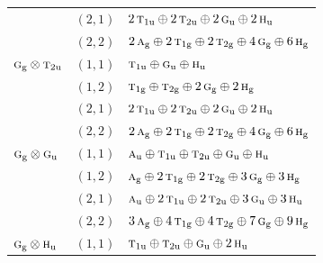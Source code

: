 \documentclass[11pt]{article}
\newcommand{\irr}[1]{\text{\normalfont\scshape #1}}
\newcommand{\ptag}[1]{\mathrm{#1}}
\begin{document}
\begin{longtable}{p{} c p{}}
 & $(2,1)$ & $2\,\irr{t}_{1\ptag{u}}\oplus 2\,\irr{t}_{2\ptag{u}}\oplus 2\,\irr{g}_{\ptag{u}}\oplus 2\,\irr{h}_{\ptag{u}}$\\

 & $(2,2)$ & $2\,\irr{a}_{\ptag{g}}\oplus 2\,\irr{t}_{1\ptag{g}}\oplus 2\,\irr{t}_{2\ptag{g}}\oplus 4\,\irr{g}_{\ptag{g}}\oplus 6\,\irr{h}_{\ptag{g}}$\\

\hline

$\irr{g}_{\ptag{g}}\otimes \irr{t}_{2\ptag{u}}$ & $(1,1)$ & $\irr{t}_{1\ptag{u}}\oplus \irr{g}_{\ptag{u}}\oplus \irr{h}_{\ptag{u}}$\\

 & $(1,2)$ & $\irr{t}_{1\ptag{g}}\oplus \irr{t}_{2\ptag{g}}\oplus 2\,\irr{g}_{\ptag{g}}\oplus 2\,\irr{h}_{\ptag{g}}$\\

 & $(2,1)$ & $2\,\irr{t}_{1\ptag{u}}\oplus 2\,\irr{t}_{2\ptag{u}}\oplus 2\,\irr{g}_{\ptag{u}}\oplus 2\,\irr{h}_{\ptag{u}}$\\

 & $(2,2)$ & $2\,\irr{a}_{\ptag{g}}\oplus 2\,\irr{t}_{1\ptag{g}}\oplus 2\,\irr{t}_{2\ptag{g}}\oplus 4\,\irr{g}_{\ptag{g}}\oplus 6\,\irr{h}_{\ptag{g}}$\\

\hline

$\irr{g}_{\ptag{g}}\otimes \irr{g}_{\ptag{u}}$ & $(1,1)$ & $\irr{a}_{\ptag{u}}\oplus \irr{t}_{1\ptag{u}}\oplus \irr{t}_{2\ptag{u}}\oplus \irr{g}_{\ptag{u}}\oplus \irr{h}_{\ptag{u}}$\\

 & $(1,2)$ & $\irr{a}_{\ptag{g}}\oplus 2\,\irr{t}_{1\ptag{g}}\oplus 2\,\irr{t}_{2\ptag{g}}\oplus 3\,\irr{g}_{\ptag{g}}\oplus 3\,\irr{h}_{\ptag{g}}$\\

 & $(2,1)$ & $\irr{a}_{\ptag{u}}\oplus 2\,\irr{t}_{1\ptag{u}}\oplus 2\,\irr{t}_{2\ptag{u}}\oplus 3\,\irr{g}_{\ptag{u}}\oplus 3\,\irr{h}_{\ptag{u}}$\\

 & $(2,2)$ & $3\,\irr{a}_{\ptag{g}}\oplus 4\,\irr{t}_{1\ptag{g}}\oplus 4\,\irr{t}_{2\ptag{g}}\oplus 7\,\irr{g}_{\ptag{g}}\oplus 9\,\irr{h}_{\ptag{g}}$\\

\hline

$\irr{g}_{\ptag{g}}\otimes \irr{h}_{\ptag{u}}$ & $(1,1)$ & $\irr{t}_{1\ptag{u}}\oplus \irr{t}_{2\ptag{u}}\oplus \irr{g}_{\ptag{u}}\oplus 2\,\irr{h}_{\ptag{u}}$\\


\end{longtable}
\end{document}
